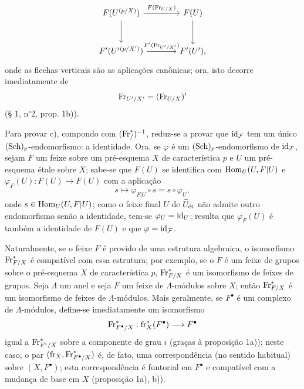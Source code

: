 \[
\begin{tikzcd}[column sep=large,row sep=large]
F(U^{(p/X)}) \arrow[r,"F(\Fr_{U/X})"] \arrow[d]
& F(U) \arrow[d]\\
F'(U'{}^{(p/X')}) \arrow[r,"F'(\Fr_{U'/X'})"]
& F'(U') ,
\end{tikzcd}
\]
onde as flechas verticais são as aplicações canônicas; ora, isto decorre imediatamente de
\[
\operatorname{Fr}_{U'/X'}=(\operatorname{Fr}_{U/X})'
\]
(§ 1, n$^\circ$2, prop. 1b)).

Para provar c), compondo com $(\operatorname{Fr}^*_{/})^{-1}$, reduz-se a provar que $\operatorname{id}_{\mathcal F}$ tem um único $(\operatorname{Sch})_p$-endomorfismo: a identidade. Ora, se $\varphi$ é um $(\operatorname{Sch})_p$-endomorfismo de $\operatorname{id}_{\mathcal F}$, sejam $F$ um feixe sobre um pré-esquema $X$ de característica $p$ e $U$ um pré-esquema étale sobre $X$; sabe-se que $F(U)$ se identifica com $\operatorname{Hom}_U(U,F|U)$ e $\varphi_F(U):F(U)\to F(U)$ com a aplicação
\[
s\longmapsto \varphi_{F|U}\circ s=s\circ\varphi_U,
\]
onde $s\in\operatorname{Hom}_U(U,F|U)$; como o feixe final $U$ de $\widetilde U_{\mathrm{\acute{e}t}}$ não admite outro endomorfismo senão a identidade, tem-se $\varphi_U=\operatorname{id}_U$; resulta que $\varphi_F(U)$ é também a identidade de $F(U)$ e que $\varphi=\operatorname{id}_{\mathcal F}$.

Naturalmente, se o feixe $F$ é provido de uma estrutura algebraica, o isomorfismo $\operatorname{Fr}^*_{F/X}$ é compatível com essa estrutura; por exemplo, se o $F$ é um feixe de grupos sobre o pré-esquema $X$ de característica $p$, $\operatorname{Fr}^*_{F/X}$ é um isomorfismo de feixes de grupos. Seja $\Lambda$ um anel e seja $F$ um feixe de $\Lambda$-módulos sobre $X$; então $\operatorname{Fr}^*_{F/X}$ é um isomorfismo de feixes de $\Lambda$-módulos. Mais geralmente, se $F^\bullet$ é um complexo de $\Lambda$-módulos, define-se imediatamente um isomorfismo
\[
\operatorname{Fr}^*_{F^\bullet/X}:\operatorname{fr}_X^*(F^\bullet)\longrightarrow F^\bullet
\]
igual a $\operatorname{Fr}^*_{F^i/X}$ sobre a componente de grau $i$ (graças à proposição 1a)); neste caso, o par $(\operatorname{fr}_X,\operatorname{Fr}^*_{F^\bullet/X})$ é, de fato, uma correspondência (no sentido habitual) sobre $(X,F^\bullet)$; esta correspondência é funtorial em $F^\bullet$ e compatível com a mudança de base em $X$ (proposição 1a), b)).
